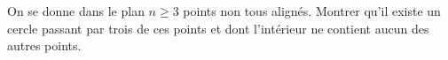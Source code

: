 On se donne dans le plan $n \geq 3$ points non tous alignés. Montrer qu'il existe un cercle passant par trois de ces points et dont l'intérieur ne contient aucun des autres points.
